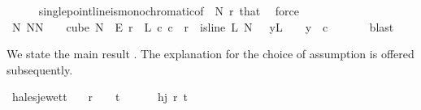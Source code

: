 \begin{isabellebody}
\ \ \ \ \isamarkupfalse%
\ single{\isacharunderscore}{\kern0pt}point{\isacharunderscore}{\kern0pt}line{\isacharunderscore}{\kern0pt}is{\isacharunderscore}{\kern0pt}monochromatic{\isacharbrackleft}{\kern0pt}of\ {\isasymchi}\ N{\isacharprime}{\kern0pt}\ r{\isacharbrackright}{\kern0pt}\ that\ \isamarkupfalse%
\ force\isanewline
\ \ \isamarkupfalse%
\ \isamarkupfalse%
\ {\isachardoublequoteopen}{\isasymexists}N{\isachargreater}{\kern0pt}{}{\isachardot}{\kern0pt}\ {\isasymforall}N{\isacharprime}{\kern0pt}{\isasymge}N{\isachardot}{\kern0pt}\ {\isasymforall}{\isasymchi}{\isachardot}{\kern0pt}\ {\isasymchi}\ {\isasymin}\ cube\ N{\isacharprime}{\kern0pt}\ {}\ {\isasymrightarrow}\isactrlsub E\ {\isacharbraceleft}{\kern0pt}{\isachardot}{\kern0pt}{\isachardot}{\kern0pt}{\isacharless}{\kern0pt}r{\isacharbraceright}{\kern0pt}\ {\isasymlongrightarrow}\ {\isacharparenleft}{\kern0pt}{\isasymexists}L\ c{\isachardot}{\kern0pt}\ c\ {\isacharless}{\kern0pt}\ r\ {\isasymand}\ is{\isacharunderscore}{\kern0pt}line\ L\ N{\isacharprime}{\kern0pt}\ {}\ {\isasymand}\ {\isacharparenleft}{\kern0pt}{\isasymforall}y{\isasymin}L\ {\isacharbackquote}{\kern0pt}\ {\isacharbraceleft}{\kern0pt}{\isachardot}{\kern0pt}{\isachardot}{\kern0pt}{\isacharless}{\kern0pt}{}{\isacharbraceright}{\kern0pt}{\isachardot}{\kern0pt}\ {\isasymchi}\ y\ {\isacharequal}{\kern0pt}\ c{\isacharparenright}{\kern0pt}{\isacharparenright}{\kern0pt}{\isachardoublequoteclose}\ \isanewline
\ \ \ \ \isamarkupfalse%
\ blast\isanewline
{}\isamarkupfalse%
%
\endisatagproof
{\isafoldproof}%
%
\isadelimproof
%
\endisadelimproof
%
\isadelimdocument
%
\endisadelimdocument
%
\isatagdocument
%
\isamarkuptrue%
%
\endisatagdocument
{\isafolddocument}%
%
\isadelimdocument
%
\endisadelimdocument
%
\begin{isamarkuptext}%
We state the main result . The explanation for the choice of assumption is
offered subsequently.%
\end{isamarkuptext}\isamarkuptrue%
\isamarkupfalse%
\ hales{\isacharunderscore}{\kern0pt}jewett{\isacharcolon}{\kern0pt}\isanewline
\ \ \ {\isachardoublequoteopen}{\isasymnot}{\isacharparenleft}{\kern0pt}r\ {\isacharequal}{\kern0pt}\ {}\ {\isasymand}\ t\ {\isacharequal}{\kern0pt}\ {}{\isacharparenright}{\kern0pt}{\isachardoublequoteclose}\ \isanewline
\ \ \ {\isachardoublequoteopen}hj\ r\ t{\isachardoublequoteclose}\isanewline

\end{isabellebody}

